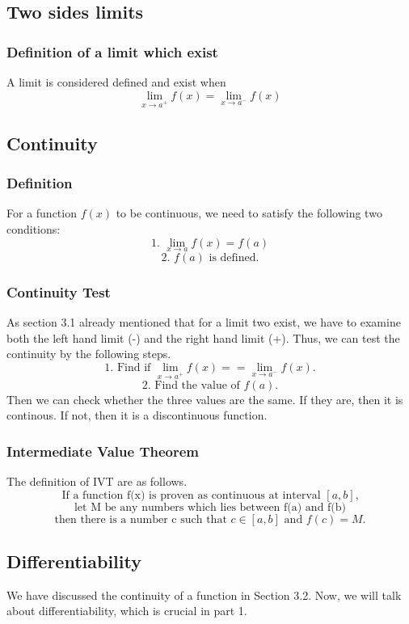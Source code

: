 \documentclass{article}
\begin{document}
\subsection{Two sides limits}
\subsubsection{Definition of a limit which exist}
A limit is considered defined and exist when
\begin{equation*}
  \lim_{x \to a^+} f(x) = \lim_{x \to a^-} f(x) 
\end{equation*}
\subsection{Continuity}
\subsubsection{Definition}
For a function $f(x)$ to be continuous, we need to satisfy the following two conditions:
\begin{equation*}
  \text{1. }\lim_{x \to a} f(x) = f(a)
\end{equation*}
\begin{equation*}
  \text{2. }f(a)\text{ is defined.}
\end{equation*}
\subsubsection{Continuity Test}
As section 3.1 already mentioned that for a limit two exist, we have to examine both the left hand limit (-) and the right hand limit (+). Thus, we can test the continuity by the following steps.
$$
\text{1. Find if }\lim_{x \to a^+} f(x) == \lim_{x \to a^-} f(x) \text{.}
$$
$$
\text{2. Find the value of }f(a)\text{.}
$$
Then we can check whether the three values are the same. If they are, then it is continous. If not, then it is a discontinuous function.
\subsubsection{Intermediate Value Theorem}
The definition of IVT are as follows.
$$
\text{If a function f(x) is proven as continuous at interval }[a,b]\text{,}
$$
$$
\text{let M be any numbers which lies between f(a) and f(b)}
$$
$$
\text{then there is a number c such that }c \in [a,b] \text{ and }f(c) = M \text{.}
$$
\subsection{Differentiability}
We have discussed the continuity of a function in Section 3.2. Now, we will talk about differentiability, which is crucial in part 1.
\end{document}
